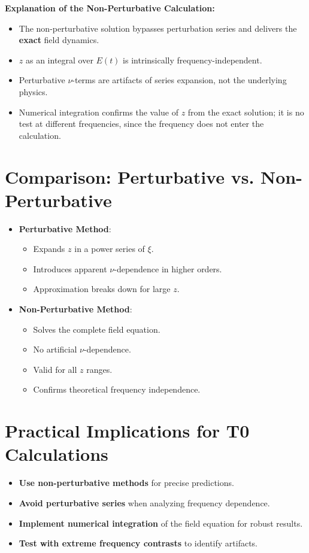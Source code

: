 	\textbf{Explanation of the Non-Perturbative Calculation:}
	\begin{itemize}
		\item The non-perturbative solution bypasses perturbation series and delivers the \textbf{exact} field dynamics.
		\item $z$ as an integral over $E(t)$ is intrinsically frequency-independent.
		\item Perturbative $\nu$-terms are artifacts of series expansion, not the underlying physics.
		\item Numerical integration confirms the value of $z$ from the exact solution; it is no test at different frequencies, since the frequency does not enter the calculation.
	\end{itemize}
	
	\section{Comparison: Perturbative vs. Non-Perturbative}
	
	\begin{itemize}
		\item \textbf{Perturbative Method}:
		\begin{itemize}
			\item Expands $z$ in a power series of $\xi$.
			\item Introduces apparent $\nu$-dependence in higher orders.
			\item Approximation breaks down for large $z$.
		\end{itemize}
		
		\item \textbf{Non-Perturbative Method}:
		\begin{itemize}
			\item Solves the complete field equation.
			\item No artificial $\nu$-dependence.
			\item Valid for all $z$ ranges.
			\item Confirms theoretical frequency independence.
		\end{itemize}
	\end{itemize}
	
	\section{Practical Implications for T0 Calculations}
	
	\begin{itemize}
		\item \textbf{Use non-perturbative methods} for precise predictions.
		\item \textbf{Avoid perturbative series} when analyzing frequency dependence.
		\item \textbf{Implement numerical integration} of the field equation for robust results.
		\item \textbf{Test with extreme frequency contrasts} to identify artifacts.
	\end{itemize}
	
